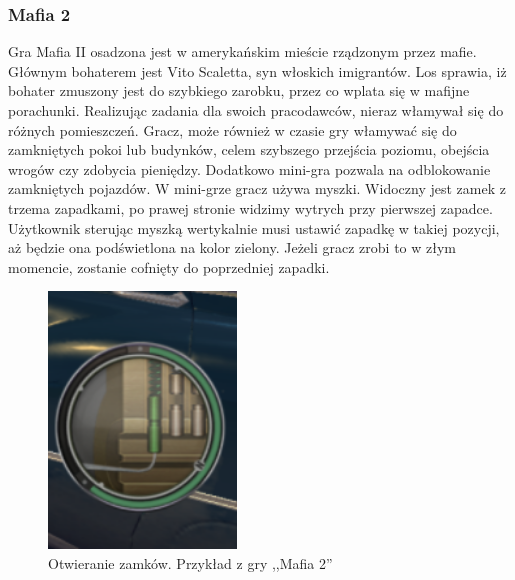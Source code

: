 \documentclass[oneside,polski,logo]{amuthesis}
\begin{document}
\subsubsection{Mafia 2}
\par Gra Mafia II osadzona jest w amerykańskim mieście rządzonym przez mafie. Głównym bohaterem jest Vito Scaletta, syn włoskich imigrantów. Los sprawia, iż bohater zmuszony jest do szybkiego zarobku, przez co wplata się w mafijne porachunki. Realizując zadania dla swoich pracodawców, nieraz włamywał się do różnych pomieszczeń. Gracz, może również w czasie gry włamywać się do zamkniętych pokoi lub budynków, celem szybszego przejścia poziomu, obejścia wrogów czy zdobycia pieniędzy. Dodatkowo mini-gra pozwala na odblokowanie zamkniętych pojazdów. W mini-grze gracz używa myszki. Widoczny jest zamek z trzema zapadkami, po prawej stronie widzimy wytrych przy pierwszej zapadce. Użytkownik sterując myszką wertykalnie musi ustawić zapadkę w takiej pozycji, aż będzie ona podświetlona na kolor zielony. Jeżeli gracz zrobi to w złym momencie, zostanie cofnięty do poprzedniej zapadki. \cite{Mafia2}
\begin{figure}[h]
	\centering
	\includegraphics[width=5cm]{images/tyrek/Mafia2.png}
	\caption{Otwieranie zamków. Przykład z gry ,,Mafia 2''}
\end{figure}
\end{document}
